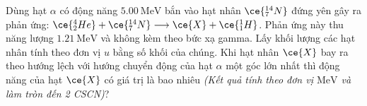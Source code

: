 \begin{ex}
	Dùng hạt $\alpha$ có động năng $\SI{5.00}{\mega\electronvolt}$ bắn vào hạt nhân $\ce{^{14}_7N}$ đứng yên gây ra phản ứng: $\ce{^4_2He}+\ce{^{14}_7N}\longrightarrow\ce{X}+\ce{^1_1H}$. Phản ứng này thu năng lượng $\SI{1.21}{\mega\electronvolt}$ và không kèm theo bức xạ gamma. Lấy khối lượng các hạt nhân tính theo đơn vị $\si{u}$ bằng số khối của chúng. Khi hạt nhân $\ce{X}$ bay ra theo hướng lệch với hướng chuyển động của hạt $\alpha$ một góc lớn nhất thì động năng của hạt $\ce{X}$ có giá trị là bao nhiêu \textit{(Kết quả tính theo đơn vị $\si{\mega\electronvolt}$ và làm tròn đến 2 CSCN)}?
\end{ex}


